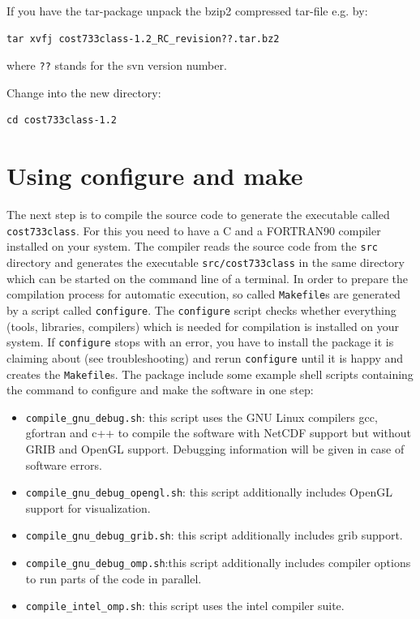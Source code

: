\documentclass[12pt, oneside, a4paper, headsepline, plainheadsepline]{scrbook}
\begin{document}
If you have the tar-package unpack the bzip2 compressed tar-file e.g. by:
\begin{lstlisting}
tar xvfj cost733class-1.2_RC_revision??.tar.bz2
\end{lstlisting} where \verb+??+ stands for the svn version number.

Change into the new directory:
\begin{lstlisting}
cd cost733class-1.2
\end{lstlisting}

\section{Using configure and make}

The next step is to compile the source code to generate the executable called \texttt{cost733class}. 
For this you need to have a C and a FORTRAN90 compiler installed on your system. 
The compiler reads the source code from the \verb+src+ directory and generates the executable \verb+src/cost733class+
in the same directory which can be started on the command line of a terminal. 
In order to prepare the compilation process for automatic execution, so called \verb+Makefile+s are generated by a script called \verb+configure+. 
The \verb+configure+ script checks whether everything (tools, libraries, compilers) which is needed for compilation is installed on your system. 
If \verb+configure+ stops with an error, you have to install the package it is 
claiming about (see troubleshooting) and rerun \verb+configure+ until it is happy and creates the \verb+Makefile+s.
The package include some example shell scripts containing the command to configure and make the software in one step:

\begin{itemize}
\item \verb!compile_gnu_debug.sh!: this script uses the GNU Linux compilers gcc, gfortran and c++ to compile the
software with NetCDF support but without GRIB and OpenGL support. Debugging information will be given in case of software errors.
\item \verb!compile_gnu_debug_opengl.sh!: this script additionally includes OpenGL support for visualization.
\item \verb!compile_gnu_debug_grib.sh!: this script additionally includes grib support.
\item \verb!compile_gnu_debug_omp.sh!:this script additionally includes compiler options to run parts of the code in parallel.
\item \verb!compile_intel_omp.sh!: this script uses the intel compiler suite.
\end{itemize}
\end{document}
